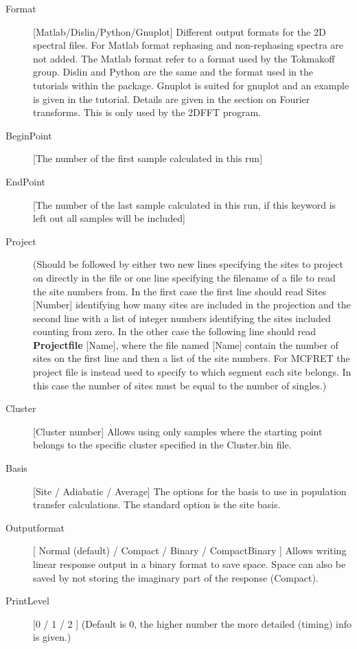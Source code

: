 \begin{description}
\item [Format] [Matlab/Dislin/Python/Gnuplot] Different output formats for the 2D spectral files. For Matlab format rephasing and non-rephasing spectra are not added. The Matlab format refer to a format used by the Tokmakoff group. Dislin and Python are the same and the format used in the tutorials within the package. Gnuplot is suited for gnuplot and an example is given in the tutorial. Details are given in the section on Fourier transforms. This is only used by the 2DFFT program. 
\item [BeginPoint] [The number of the first sample calculated in this run]
\item [EndPoint] [The number of the last sample calculated in this run, if this keyword is left out all samples will be included]
\item [Project] (Should be followed by either two new lines specifying the sites to project on directly in the file or one line specifying the filename of a file to read the site numbers from. In the first case the first line should read Sites [Number] identifying how many sites are included in the projection and the second line with a list of integer numbers identifying the sites included counting from zero. In the other case the following line should read \textbf{Projectfile} [Name], where the file named [Name] contain the number of sites on the first line and then a list of the site numbers. For MCFRET the project file is instead used to specify to which segment each site belongs. In this case the number of sites must be equal to the number of singles.)
\item [Cluster] [Cluster number] Allows using only samples where the starting point belongs to the specific cluster specified in the Cluster.bin file.
\item[Basis] [Site / Adiabatic / Average] The options for the basis to use in population transfer calculations. The standard option is the site basis.
\item[Outputformat] [ Normal (default) / Compact / Binary / CompactBinary ] Allows writing linear response output in a binary format to save space. Space can also be saved by not storing the imaginary part of the response (Compact).
\item [PrintLevel] [0 / 1 / 2 ] (Default is 0, the higher number the more detailed (timing) info is given.)
\end{description}

